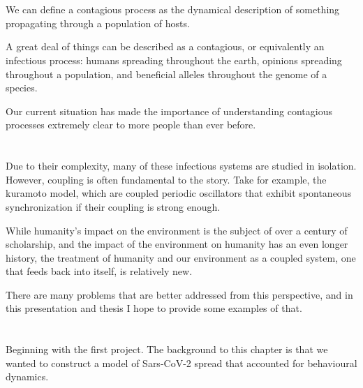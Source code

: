 \documentclass{article}
\begin{document}
\section{}

We can define a contagious process as the dynamical description of something propagating through a population of hosts. 


A great deal of things can be described as a contagious, or equivalently an infectious process: humans spreading throughout the earth, opinions spreading throughout a population, and beneficial alleles throughout the genome of a species.

Our current situation has made the importance of understanding contagious processes extremely clear to more people than ever before.

\section{}
Due to their complexity, many of these infectious systems are studied in isolation. However, coupling is often fundamental to the story. Take for example, the kuramoto model, which are coupled periodic oscillators that exhibit spontaneous synchronization if their coupling is strong enough. 

While humanity's impact on the environment is the subject of over a century of scholarship, and the impact of the environment on humanity has an even longer history, the treatment of humanity and our environment as a coupled system, one that feeds back into itself, is relatively new. 

There are many problems that are better addressed from this perspective, and in this presentation and thesis I hope to provide some examples of that. 

\section{}
Beginning with the first project. The background to this chapter is that we wanted to construct a model of Sars-CoV-2 spread that accounted for behavioural dynamics. 
\end{document}
